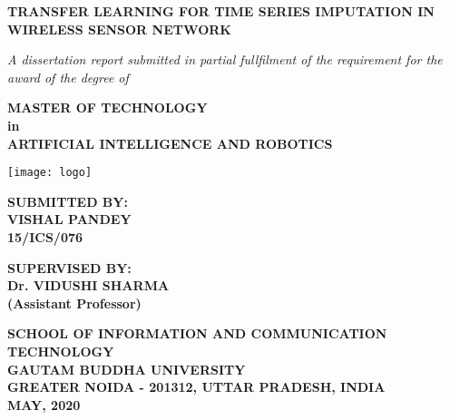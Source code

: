 \begin{titlepage}
	\begin{center}
	
		
		\Large
		\textbf{TRANSFER LEARNING FOR TIME SERIES IMPUTATION IN WIRELESS SENSOR NETWORK}
		
		\vspace{0.5cm}
		\large
		\textit{A dissertation report submitted in partial fullfilment of the requirement for the award of the degree of}
		
		\vspace{1.5cm}
		\textbf{MASTER OF TECHNOLOGY}\\
		\textbf{in}\\
		\textbf{ARTIFICIAL INTELLIGENCE AND ROBOTICS}\\
		
		\vfill
				
		
		\texttt{[image: logo]}\\

		\vfill
		
		\textbf{SUBMITTED BY:}\\
		\vspace{0.1cm}
		\textbf{VISHAL PANDEY}\\
		\textbf{15/ICS/076}
		
		\vspace{0.5cm}
		\textbf{SUPERVISED BY:}\\
		\vspace{0.1cm}
		\textbf{Dr. VIDUSHI SHARMA}\\
		\textbf{(Assistant Professor)}
		



		\vfill
		\normalsize
		\textbf{SCHOOL OF INFORMATION AND COMMUNICATION TECHNOLOGY} \\
		\textbf{GAUTAM BUDDHA UNIVERSITY} \\
		\textbf{GREATER NOIDA - 201312, UTTAR PRADESH, INDIA} \\
		\textbf{MAY, 2020}
		
	\end{center}
\end{titlepage}